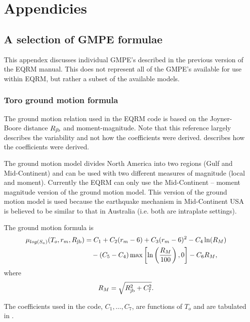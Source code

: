 \chapter{Appendicies}

\section{A selection of GMPE formulae}
\label{app:GMPE_eqns}

This appendex discusses individual GMPE's described in the previous
version of the EQRM manual.  This does not represent all of the GMPE's
available for use within EQRM, but rather a subset of the available
models.


\subsection{Toro ground motion formula}

The \citet{dr_Toro97a} ground motion relation used in the EQRM code
is based on the Joyner-Boore distance $\Rjb$ and moment-magnitude.
Note that this reference largely describes the variability and not
how the coefficients were derived. \citet{dr_EPRI93a} describes
how the coefficients were derived.

The \citet{dr_Toro97a} ground motion model divides North America
into two regions (Gulf and Mid-Continent) and can  be used with
two different measures of magnitude (local and moment). Currently
the EQRM can only use the Mid-Continent -- moment magnitude
version of the ground motion model. This version of the ground motion
model is used because the earthquake mechanism in Mid-Continent
USA is believed to be similar to that in Australia (i.e. both are
intraplate settings).

The ground motion formula is
\begin{equation}
\begin{split}
\mu_{log(S_a)}(T_o,r_m,\Rjb) &= C_1 + C_2(r_m-6) + C_3(r_m-6)^2 - C_4\ln(R_M) \\
       &\quad  - (C_5-C_4)\max\left[\ln\left(\frac{R_M}{100}\right),0\right] -C_6R_M,
\end{split}
\end{equation}
where
\begin{equation}
 R_M = \sqrt{ \Rjb^2 + C_7^2 }.
\end{equation}

The coefficients used in the code, $C_1,\ldots,C_7$, are functions
of $T_o$ and are tabulated in \citet[Table 2]{dr_Toro97a}.

